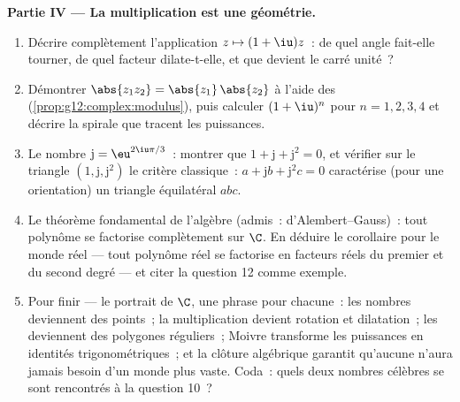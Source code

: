 \begin{problem}
\medskip
\noindent\textbf{Partie IV --- La multiplication est une
géométrie.}
\begin{enumerate}[resume]
  \item Décrire complètement l'application
        $z \mapsto (1 + \iu)z$~: de quel angle fait-elle tourner,
        de quel facteur dilate-t-elle, et que devient le carré
        unité~?
  \item Démontrer $\abs{z_1 z_2} = \abs{z_1}\,\abs{z_2}$ à l'aide
        des  (\cref{prop:g12:complex:modulus}), puis
        calculer $(1+\iu)^n$ pour $n = 1, 2, 3, 4$ et décrire la
        spirale que tracent les puissances.
  \item Le nombre $\mathrm{j} = \eu^{2\iu\pi/3}$~: montrer que
        $1 + \mathrm{j} + \mathrm{j}^2 = 0$, et vérifier sur le
        triangle $\left(1, \mathrm{j}, \mathrm{j}^2\right)$ le
        critère classique~: $a + \mathrm{j} b + \mathrm{j}^2 c = 0$
        caractérise (pour une orientation) un triangle équilatéral
        $abc$.
  \item Le théorème fondamental de l'algèbre (admis~:
        d'Alembert--Gauss)~: tout polynôme se factorise complètement
        sur $\C$. En déduire le corollaire pour le monde réel ---
        tout polynôme réel se factorise en facteurs réels du premier
        et du second degré --- et citer la question 12 comme
        exemple.
  \item Pour finir --- le portrait de $\C$, une phrase pour
        chacune~: les nombres deviennent des points~; la
        multiplication devient rotation et dilatation~; les  deviennent des polygones réguliers~; Moivre
        transforme les puissances en identités trigonométriques~; et
        la clôture algébrique garantit qu'aucune  n'aura
        jamais besoin d'un monde plus vaste. Coda~: quels deux
        nombres célèbres se sont rencontrés à la question 10~?
\end{enumerate}
\end{problem}
